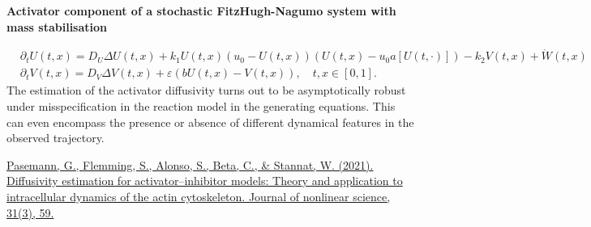{\myfontsize 
\begin{center}
\textbf{Activator component of a stochastic FitzHugh-Nagumo system with mass stabilisation}
\end{center}
\begin{equation*}
\begin{aligned}
& \partial_t U(t,x)=D_U \Delta U(t,x)+k_1 U(t,x)\left(u_0-U(t,x)\right)\left(U(t,x)-u_0 a[U(t,\cdot)]\right)-k_2 V(t,x)+\dot{W}(t, x) \\
& \partial_t V(t,x)=D_V \Delta V(t,x)+\varepsilon(b U(t,x)-V(t,x)), \quad t,x \in [0,1].
\end{aligned}
\end{equation*}
The estimation of the activator diffusivity turns out to be asymptotically robust under misspecification in the reaction model in the generating equations. This can even encompass the presence or absence of different dynamical features in the observed trajectory.\\ \par}
{\fontsize{12}{4}\selectfont
\href{https://link.springer.com/article/10.1007/s00332-021-09714-4}{Pasemann, G., Flemming, S., Alonso, S., Beta, C., \& Stannat, W. (2021). Diffusivity estimation for activator–inhibitor models: Theory and application to intracellular dynamics of the actin cytoskeleton. Journal of nonlinear science, 31(3), 59.} \par
}